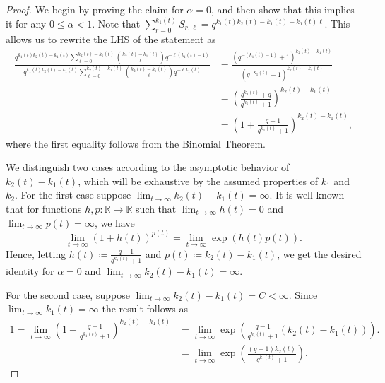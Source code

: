 \documentclass[10pt,a4paper]{amsart}
\begin{document}
\begin{proof}
We begin by proving the claim for $\alpha = 0$, and then show that this implies it for any $0 \le \alpha <1$. Note that $\sum_{r=0}^{k_1(t)} S_{r,\ell} = q^{k_1(t)k_2(t) - k_1(t) - k_1(t)\ell}$. This allows us to rewrite the LHS of the statement as
    \begin{align*}
       \frac{q^{k_1(t) k_2(t) - k_1(t)}\sum_{\ell = 0}^{k_2(t)-k_1(t)} \binom{k_2(t)-k_1(t)}{\ell}q^{-\ell(k_1(t)-1)}}{q^{k_1(t)k_2(t)-k_1(t)}\sum_{\ell=0}^{k_2(t)-k_1(t)}\binom{k_2(t)-k_1(t)}{\ell}q^{-\ell k_1(t)}} &= \frac{(q^{-(k_1(t)-1)} +1)^{k_2(t)-k_1(t)}}{(q^{-k_1(t)} + 1)^{k_2(t)-k_1(t)}}\\
                &= \left(\frac{q^{k_1(t)} +q}{q^{k_1(t)}+1}\right)^{k_2(t)-k_1(t)}\\
                &= \left(1 + \frac{q-1}{q^{k_1(t)}+1}\right)^{k_2(t)-k_1(t)}, 
    \end{align*}
where the first equality follows from the Binomial Theorem. 


We distinguish two cases according to the asymptotic behavior of $k_2(t)-k_1(t)$, which will be exhaustive by the assumed properties of $k_1$ and $k_2$. For the first case suppose $\lim_{t \rightarrow \infty} k_2(t) - k_1(t) =\infty$. It is well known that for functions $h,p\colon \mathbb{R}\rightarrow \mathbb{R}$ such that $\lim_{t \rightarrow \infty} h(t) = 0$ and $\lim_{t \rightarrow \infty} p(t) = \infty$, we have $$\lim_{t \rightarrow \infty}(1+h(t))^{p(t)} = \lim_{t \rightarrow \infty} \exp({h(t)p(t)}).$$
Hence, letting $h(t) \coloneqq  \frac{q-1}{q^{k_1(t)}+1}$ and $p(t) \coloneqq k_2(t)-k_1(t)$, 
we get the desired identity for $\alpha = 0$ and $\lim_{t \rightarrow \infty} k_2(t) - k_1(t) =\infty$.


For the second case, suppose $\lim_{t \rightarrow \infty} k_2(t) - k_1(t) = C < \infty.$ Since $\lim_{t \rightarrow \infty} k_1(t) = \infty$ the result follows as
\begin{align*}
    1= \lim_{t \rightarrow \infty} \left(1 + \frac{q-1}{q^{k_1(t)}+1}\right)^{k_2(t)-k_1(t)} &=  \lim_{t \rightarrow \infty} \exp\left({\frac{q-1}{q^{k_1(t)}+1}(k_2(t)-k_1(t))}\right). \\
    &=  \lim_{t \rightarrow \infty} \exp\left({\frac{(q-1)k_2(t)}{q^{k_1(t)}+1}}\right).
\end{align*}


\end{proof}
\end{document}
